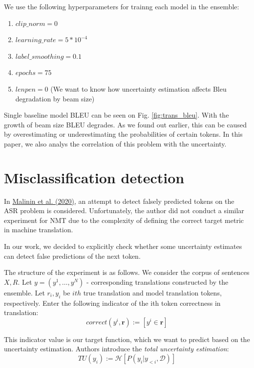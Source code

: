 \documentclass[a4paper,14pt]{extarticle}
\newcommand{\bibref}[3]{\hyperlink{#1}{#2 (#3)}}
\begin{document}
	We use the following hyperparameters for trainng each model in the ensemble:
	\begin{enumerate}
		\item $clip\_norm = 0$
		\item $learning\_rate=5*10^{-4}$
		\item $label\_smoothing=0.1$
		\item $epochs=75$
		\item $lenpen=0$ (We want to know how uncertainty estimation affects Bleu degradation by beam size)
	\end{enumerate}
	
	Single baseline model BLEU can be seen on Fig. \ref{fig:trans_bleu}. With the growth of beam size BLEU degrades. As we found out earlier, this can be caused by overestimating or underestimating the probabilities of certain tokens. In this paper, we also analys the correlation of this problem with the uncertainty.
	
\section{Misclassification detection}
	In \bibref{uncertainty}{Malinin et al.} {2020}, an attempt to detect falsely predicted tokens on the ASR problem is considered. Unfortunately, the author did not conduct a similar experiment for NMT due to the complexity of defining the correct target metric in machine translation.

	In our work, we decided to explicitly check whether some uncertainty estimates can detect false predictions of the next token.

	The structure of the experiment is as follows. We consider the corpus of sentences $X, R$. Let $y = (y^1, \dots, y^N)$ - corresponding translations constructed by the ensemble. Let $r_{i}, y_{i}$ be $ith$  true translation and model translation tokens, respectively. Enter the following indicator of the ith token correctness in translation:
	\begin{equation}
		correct(y^{i}, \textbf{r}) := [y^{i} \in \textbf{r}]
	\end{equation}
	
	This indicator value is our target function, which we want to predict based on the uncertainty estimation. Authors introduce the \textit{total uncertainty estimation}:
	\begin{equation}
		TU(y_i) := \mathcal{H}[P(y_i|y_{<i}, \mathcal{D})]
	\end{equation}
	
\end{document}
